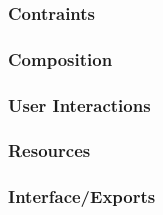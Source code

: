 \subsubsection{Contraints}
\label{sec:constraints}

\subsubsection{Composition}
\label{sec:mapping_composition}

\subsubsection{User Interactions}
\label{sec:interactions}

\subsubsection{Resources}
\label{sec:resources}

\subsubsection{Interface/Exports}
\label{sec:exports}

